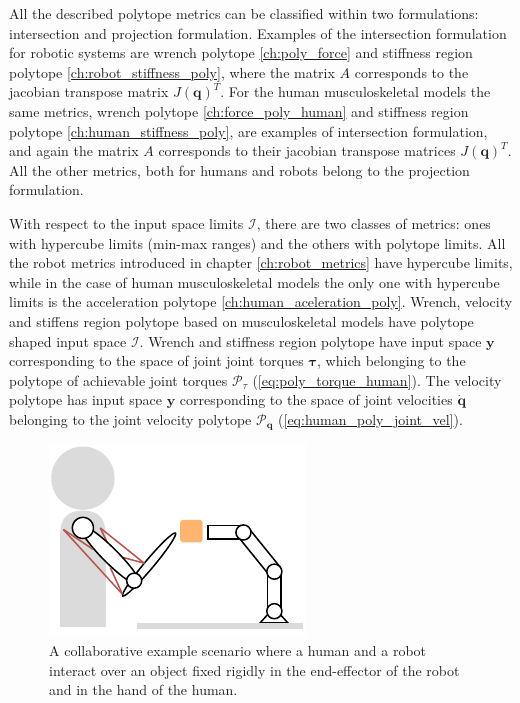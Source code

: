 All the described polytope metrics can be classified within two formulations: intersection and projection formulation. 
Examples of the intersection formulation for robotic systems are wrench polytope \ref{ch:poly_force} and stiffness region polytope \ref{ch:robot_stiffness_poly}, where the matrix $A$ corresponds to the jacobian transpose matrix $J(\bm{q})^T$. For the human musculoskeletal models the same metrics, wrench polytope \ref{ch:force_poly_human} and stiffness region polytope \ref{ch:human_stiffness_poly}, are examples of intersection formulation, and again the matrix $A$ corresponds to their jacobian transpose matrices $J(\bm{q})^T$. All the other metrics, both for humans and robots belong to the projection formulation.

With respect to the input space limits $\mathcal{I}$, there are two classes of metrics: ones with hypercube limits (min-max ranges) and the others with polytope limits. All the robot metrics introduced in chapter \ref{ch:robot_metrics} have hypercube limits, while in the case of human musculoskeletal models the only one with hypercube limits is the acceleration polytope \ref{ch:human_aceleration_poly}. Wrench, velocity and stiffens region polytope based on musculoskeletal models have polytope shaped input space $\mathcal{I}$. Wrench and stiffness region polytope have input space $\bm{y}$ corresponding to the space of joint joint torques $\bm{\tau}$, which belonging to the polytope of achievable joint torques $\mathcal{P}_\tau$ (\ref{eq:poly_torque_human}). The velocity polytope has input space $\bm{y}$ corresponding to the space of joint velocities $\dot{\bm{q}}$ belonging to the joint velocity polytope $\mathcal{P}_{\dot{\bm{q}}}$ (\ref{eq:human_poly_joint_vel}).


\begin{figure}[!h]
    \centering
    \includegraphics{Chapters/imgs/example_inter.pdf}
    \caption{A collaborative example scenario where a human and a robot interact over an object fixed rigidly in the end-effector of the robot and in the hand of the human.}
    \label{fig:table_inter}
\end{figure}

